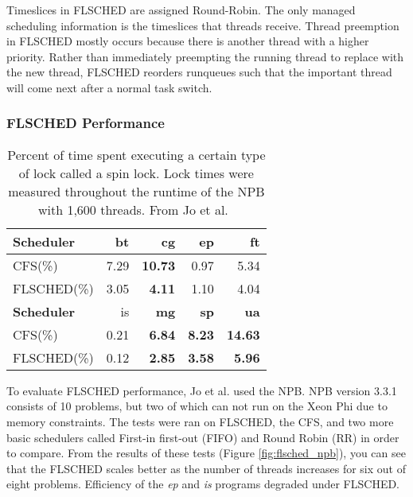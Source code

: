 \documentclass{sig-alternate}
\begin{document}
Timeslices in FLSCHED are assigned Round-Robin. The only managed scheduling information is the timeslices that threads receive. Thread preemption in FLSCHED mostly occurs because there is another thread with a higher priority. Rather than immediately preempting the running thread to replace with the new thread, FLSCHED reorders runqueues such that the important thread will come next after a normal task switch.~\cite{Jo:2017}


\subsubsection{FLSCHED Performance}
\label{sec:flsched_performance}


\begin{table}
	\begin{tabular}{| l | r | r | r | r |}
		\hline
		\textbf{Scheduler} & bt & \textbf{cg} & ep & ft \\ \hline
		CFS(\%) & 7.29 & \textbf{10.73} & 0.97 & 5.34 \\
		FLSCHED(\%) & 3.05 & \textbf{4.11} & 1.10 & 4.04 \\ \hline \hline 
		
		\textbf{Scheduler} & is & \textbf{mg} & \textbf{sp} & \textbf{ua} \\ \hline
		CFS(\%) & 0.21 & \textbf{6.84} & \textbf{8.23} & \textbf{14.63} \\
		FLSCHED(\%) & 0.12 & \textbf{2.85} & \textbf{3.58} & \textbf{5.96} \\ \hline
		
		\hline
	\end{tabular}
	\caption{ Percent of time spent executing a certain type of lock called a spin lock. Lock times were measured throughout the runtime of the NPB with 1,600 threads. From Jo et al.~\cite{Jo:2017}}
	\label{fig:flsched_spinlock}
\end{table}


\begin{figure*}
	\centering
	\caption{FLSCHED performance comparison of various schedulers on programs in the NAS Parallel Benchmark. From Jo et al.~\cite{Jo:2017}}
	\label{fig:flsched_npb}
\end{figure*}

 To evaluate FLSCHED performance, Jo et al. used the NPB. NPB version 3.3.1 consists of 10 problems, but two of which can not run on the Xeon Phi due to memory constraints. The tests were ran on FLSCHED, the CFS, and two more basic schedulers called First-in first-out (FIFO) and Round Robin (RR) in order to compare. From the results of these tests (Figure \ref{fig:flsched_npb}), you can see that the FLSCHED scales better as the number of threads increases for six out of eight problems. Efficiency of the \textit{ep} and \textit{is} programs degraded under FLSCHED.~\cite{Jo:2017}
\end{document}
